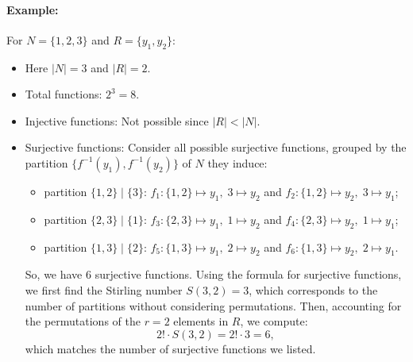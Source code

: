\documentclass[docmute]{article}
\begin{document}
\paragraph{Example:}  
For \( N = \{1, 2, 3\} \) and \( R = \{y_1, y_2\} \):
\begin{itemize}[nosep]
    \item[] Here \( |N| = 3 \) and \( |R| = 2 \).
    \item Total functions: $2^3 = 8$.
    \item Injective functions: Not possible since $|R|<|N|$.
    \item Surjective functions: Consider all possible surjective functions, grouped by the partition \(\{f^{-1}(y_1), f^{-1}(y_2)\}\) of \(N\) they induce:
    \begin{itemize}[nosep]
      \item partition \(\{1,2\} \mid \{3\}\): \quad \( f_1: \{1, 2\} \mapsto y_1,\; 3 \mapsto y_2 \) \quad and \quad \( f_2: \{1, 2\} \mapsto y_2,\; 3 \mapsto y_1 \);
      \item partition \(\{2,3\} \mid \{1\}\): \quad \( f_3: \{2, 3\} \mapsto y_1,\; 1 \mapsto y_2 \) \quad and \quad \( f_4: \{2, 3\} \mapsto y_2,\; 1 \mapsto y_1 \);
      \item partition \(\{1,3\} \mid \{2\}\): \quad \( f_5: \{1, 3\} \mapsto y_1,\; 2 \mapsto y_2 \) \quad and \quad \( f_6: \{1, 3\} \mapsto y_2,\; 2 \mapsto y_1 \).
    \end{itemize}
So, we have 6 surjective functions. Using the formula for surjective functions, we first find the Stirling number \( S(3, 2) = 3 \), which corresponds to the number of partitions without considering permutations. Then, accounting for the permutations of the \( r = 2 \) elements in \( R \), we compute:
\[
2! \cdot S(3, 2) = 2! \cdot 3 = 6,
\]
which matches the number of surjective functions we listed.
\end{itemize}
\end{document}
